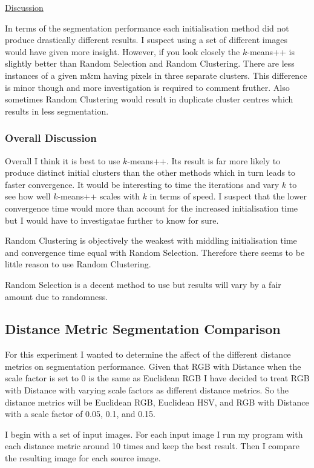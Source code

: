 \documentclass{article}
\begin{document}
\underline{Discussion}

In terms of the segmentation performance each initialisation method did not produce drastically different results. I suspect using a set of different images would have given more insight. However, if you look closely the $k$-means++ is slightly better than Random Selection and Random Clustering. There are less instances of a given m\&m having pixels in three separate clusters. This difference is minor though and more investigation is required to comment fruther. Also sometimes Random Clustering would result in duplicate cluster centres which results in less segmentation. 

\subsubsection{Overall Discussion}

Overall I think it is best to use $k$-means++. Its result is far more likely to produce distinct initial clusters than the other methods which in turn leads to faster convergence. It would be interesting to time the iterations and vary $k$ to see how well $k$-means++ scales with $k$ in terms of speed. I suspect that the lower convergence time would more than account for the increased initialisation time but I would have to investigatae further to know for sure. 

Random Clustering is objectively the weakest with middling initialisation time and convergence time equal with Random Selection. Therefore there seems to be little reason to use Random Clustering. 

Random Selection is a decent method to use but results will vary by a fair amount due to randomness.

\subsection{Distance Metric Segmentation Comparison}

For this experiment I wanted to determine the affect of the different distance metrics on segmentation performance. Given that RGB with Distance when the scale factor is set to 0 is the same as Euclidean RGB I have decided to treat RGB with Distance with varying scale factors as different distance metrics. So the distance metrics will be Euclidean RGB, Euclidean HSV, and RGB with Distance with a scale factor of 0.05, 0.1, and 0.15. 

I begin with a set of input images. For each input image I run my program with each distance metric around 10 times and keep the best result. Then I compare the resulting image for each source image. 
\end{document}

